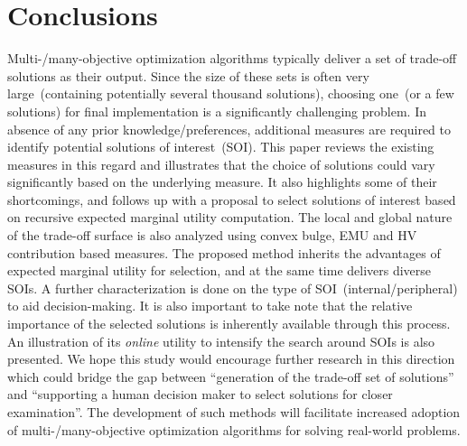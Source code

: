 \section{Conclusions}
\label{sec:sum}
Multi-/many-objective optimization algorithms typically deliver a set of trade-off solutions as their output. Since the size of these sets is often very large~(containing potentially several thousand solutions), choosing one~(or a few solutions) for final implementation is a significantly challenging problem. In absence of any prior knowledge/preferences, additional measures are required to identify potential solutions of interest~(SOI). This paper reviews the existing measures in this regard and illustrates that the choice of solutions could vary significantly based on the underlying measure. It also highlights some of their shortcomings, and follows up with a proposal to select solutions of interest based on recursive expected marginal utility computation. The local and global nature of the trade-off surface is also analyzed using convex bulge, EMU and HV contribution based measures. The proposed method inherits the advantages of expected marginal utility for selection, and at the same time delivers diverse SOIs. A further characterization is done on the type of SOI~(internal/peripheral) to aid decision-making. It is also important to take note that the relative importance of the selected solutions is inherently available through this process. An illustration of its \emph{online} utility to intensify the search around SOIs is also presented. We hope this study would encourage further research in this direction which could bridge the gap between ``generation of the trade-off set of solutions'' and ``supporting a human decision maker to select solutions for closer examination''. The development of such methods will facilitate increased adoption of multi-/many-objective optimization algorithms for solving real-world problems. 

